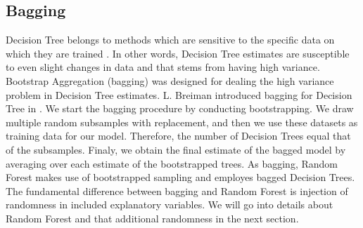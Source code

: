 \subsection{Bagging}
Decision Tree belongs to methods which are sensitive to the specific data on which they are trained \cite{friedman2001elements}. 
In other words, Decision Tree estimates are susceptible to even slight changes in data and 
that stems from having high variance.
Bootstrap Aggregation (bagging) was designed for dealing the high variance problem in Decision Tree estimates.
L. Breiman introduced bagging for Decision Tree in \cite{breiman1996bagging}.
We start the bagging procedure by conducting bootstrapping.
We draw multiple random subsamples with replacement,
and then we use these datasets as training data for our model.
Therefore, the number of Decision Trees equal that of the subsamples. 
Finaly, we obtain the final estimate of the bagged model by averaging over each estimate of the bootstrapped trees.
As bagging, Random Forest makes use of bootstrapped sampling and employes bagged Decision Trees.
The fundamental difference between bagging and Random Forest is 
injection of randomness in included explanatory variables. 
We will go into details about Random Forest and that additional randomness in the next section.
